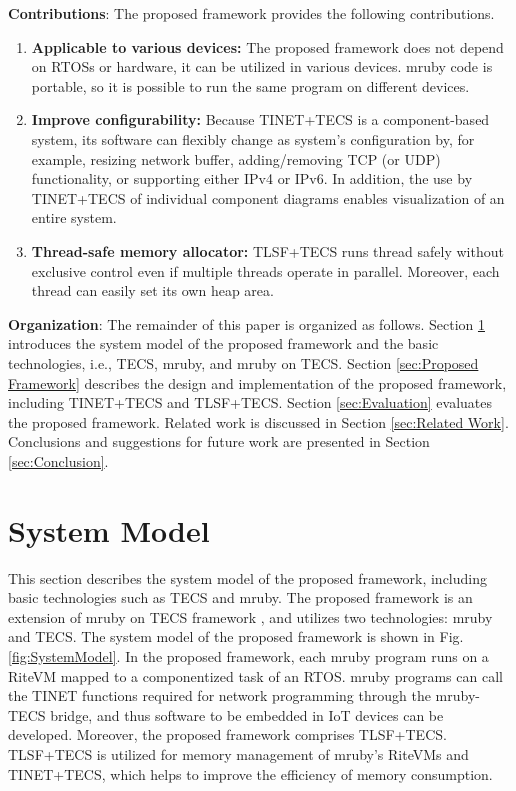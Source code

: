 \documentclass[JIP]{ipsj_v2/UTF8/ipsj}
\begin{document}
{\bf Contributions}: The proposed framework provides the following contributions.
\begin{enumerate}
\item {\bf Applicable to various devices:}
The proposed framework does not depend on RTOSs or hardware, it can be utilized in various devices.
mruby code is portable, so it is possible to run the same program on different devices.

\item {\bf Improve configurability:}
Because TINET+TECS is a component-based system, its software can flexibly change as system's configuration by, for example, resizing network buffer, adding/removing TCP (or UDP) functionality, or supporting either IPv4 or IPv6.
In addition, the use by TINET+TECS of individual component diagrams enables visualization of an entire system.

\item {\bf Thread-safe memory allocator:}
TLSF+TECS runs thread safely without exclusive control even if multiple threads operate in parallel.
Moreover, each thread can easily set its own heap area.

\end{enumerate}

{\bf Organization}: The remainder of this paper is organized as follows.
Section \ref{sec:System Model} introduces the system model of the proposed framework and the basic technologies, i.e., TECS, mruby, and mruby on TECS.
Section \ref{sec:Proposed Framework} describes the design and implementation of the proposed framework, including TINET+TECS and TLSF+TECS.
Section \ref{sec:Evaluation} evaluates the proposed framework.
Related work is discussed in Section \ref{sec:Related Work}.
Conclusions and suggestions for future work are presented in Section \ref{sec:Conclusion}.


\section{System Model}
\label{sec:System Model}

This section describes the system model of the proposed framework, including basic technologies such as TECS and mruby.
The proposed framework is an extension of mruby on TECS framework \cite{par:mrubyonTECS}\cite{par:mrubyonTECS3}, and utilizes two technologies: mruby and TECS.
The system model of the proposed framework is shown in Fig.\ref{fig:SystemModel}.
In the proposed framework, each mruby program runs on a RiteVM mapped to a componentized task of an RTOS.
mruby programs can call the TINET functions required for network programming through the mruby-TECS bridge, and thus software to be embedded in IoT devices can be developed.
Moreover, the proposed framework comprises TLSF+TECS.
TLSF+TECS is utilized for memory management of mruby's RiteVMs and TINET+TECS, which helps to improve the efficiency of memory consumption.
\end{document}
